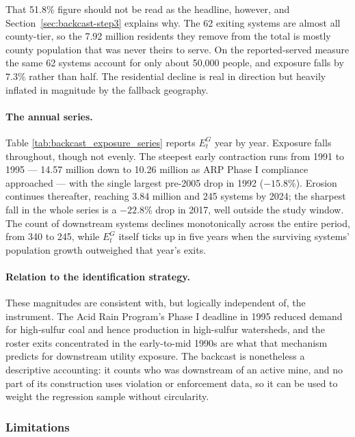 That 51.8\% figure should not be read as the headline, however, and
Section~\ref{sec:backcast-step3} explains why. The 62 exiting systems are almost
all county-tier, so the 7.92 million residents they remove from the total is
mostly county population that was never theirs to serve. On the reported-served
measure the same 62 systems account for only about 50,000 people, and exposure
falls by $7.3$\% rather than half. The residential decline is real in direction
but heavily inflated in magnitude by the fallback geography.



\paragraph{The annual series.}
Table \ref{tab:backcast_exposure_series} reports $E^{G}_t$ year by year. Exposure
falls throughout, though not evenly. The steepest early contraction runs from 1991
to 1995 --- 14.57 million down to 10.26 million as ARP Phase I compliance
approached --- with the single largest pre-2005 drop in 1992 ($-15.8$\%). Erosion
continues thereafter, reaching 3.84 million and 245 systems by 2024; the sharpest
fall in the whole series is a $-22.8$\% drop in 2017, well outside the study
window. The count of downstream systems declines monotonically across the entire
period, from 340 to 245, while $E^{G}_t$ itself ticks up in five years when the
surviving systems' population growth outweighed that year's exits.



\paragraph{Relation to the identification strategy.}
These magnitudes are consistent with, but logically independent of, the
instrument. The Acid Rain Program's Phase I deadline in 1995 reduced demand for
high-sulfur coal and hence production in high-sulfur watersheds, and the roster
exits concentrated in the early-to-mid 1990s are what that mechanism predicts for
downstream utility exposure. The backcast is nonetheless a descriptive
accounting: it counts who was downstream of an active mine, and no part of its
construction uses violation or enforcement data, so it can be used to weight the
regression sample without circularity.

\subsubsection{Limitations}

